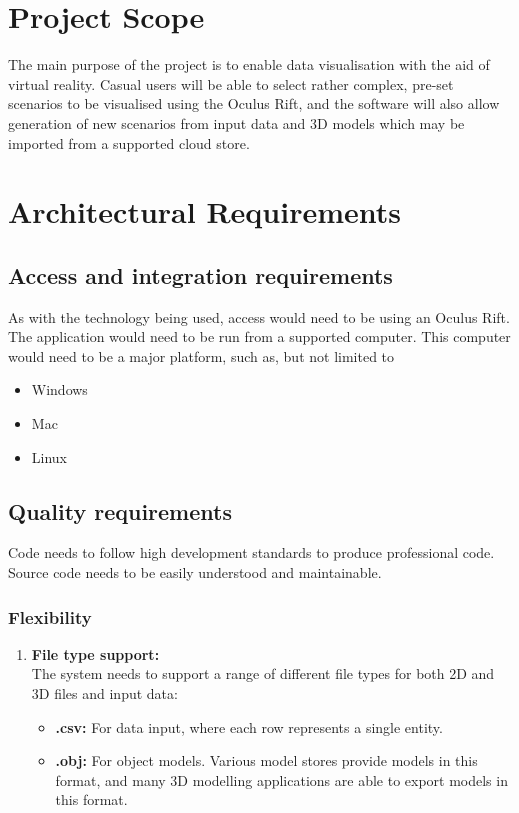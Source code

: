 \documentclass[a4paper,12pt]{report}
\begin{document}
\newpage
%
%




\section{Project Scope}		%

	The main purpose of the project is to enable data visualisation with the aid of virtual reality. Casual users will be able to select rather complex, pre-set scenarios to be visualised using the Oculus Rift, and the software will also allow generation of new scenarios from input data and 3D models which may be imported from a supported cloud store.

\newpage
%
%


\section{Architectural Requirements}	%

\subsection{Access and integration requirements}
As with the technology being used, access would need to be using an Oculus Rift. \newline\newline The application would need to be run from a supported computer. This computer would need to be a major platform, such as, but not limited to
\begin{itemize}
	\item Windows
	\item Mac
	\item Linux
\end{itemize}

\subsection{Quality requirements}
Code needs to follow high development standards to produce professional code. Source code needs to be easily understood and maintainable.

\subsubsection{Flexibility}
\begin{enumerate}
	\item \textbf{File type support:}\\
	The system needs to support a range of different file types for both 2D and 3D files and input data:
	\begin{itemize}
		\item \textbf{.csv:} For data input, where each row represents a single entity.
		\item \textbf{.obj:} For object models. Various model stores provide models in this format, and many 3D modelling applications are able to export models in this format.
	\end{itemize}
\end{enumerate}
\end{document}
